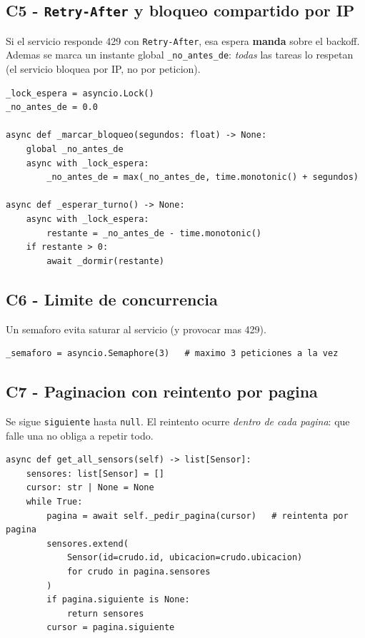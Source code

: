 \documentclass[11pt,a4paper]{article}
\newcommand{\arch}[1]{\texttt{#1}}
\begin{document}
\subsection{C5 - \arch{Retry-After} y bloqueo compartido por IP}
Si el servicio responde 429 con \arch{Retry-After}, esa espera
\textbf{manda} sobre el backoff. Ademas se marca un instante global
\arch{\_no\_antes\_de}: \emph{todas} las tareas lo respetan (el servicio
bloquea por IP, no por peticion).

\begin{lstlisting}[caption={Bloqueo global por IP}]
_lock_espera = asyncio.Lock()
_no_antes_de = 0.0

async def _marcar_bloqueo(segundos: float) -> None:
    global _no_antes_de
    async with _lock_espera:
        _no_antes_de = max(_no_antes_de, time.monotonic() + segundos)

async def _esperar_turno() -> None:
    async with _lock_espera:
        restante = _no_antes_de - time.monotonic()
    if restante > 0:
        await _dormir(restante)
\end{lstlisting}

\subsection{C6 - Limite de concurrencia}
Un semaforo evita saturar al servicio (y provocar mas 429).

\begin{lstlisting}[caption={Semaforo de concurrencia}]
_semaforo = asyncio.Semaphore(3)   # maximo 3 peticiones a la vez
\end{lstlisting}

\subsection{C7 - Paginacion con reintento por pagina}
Se sigue \arch{siguiente} hasta \arch{null}. El reintento ocurre
\emph{dentro de cada pagina}: que falle una no obliga a repetir todo.

\begin{lstlisting}[caption={Paginacion completa}]
async def get_all_sensors(self) -> list[Sensor]:
    sensores: list[Sensor] = []
    cursor: str | None = None
    while True:
        pagina = await self._pedir_pagina(cursor)   # reintenta por pagina
        sensores.extend(
            Sensor(id=crudo.id, ubicacion=crudo.ubicacion)
            for crudo in pagina.sensores
        )
        if pagina.siguiente is None:
            return sensores
        cursor = pagina.siguiente
\end{lstlisting}
\end{document}
